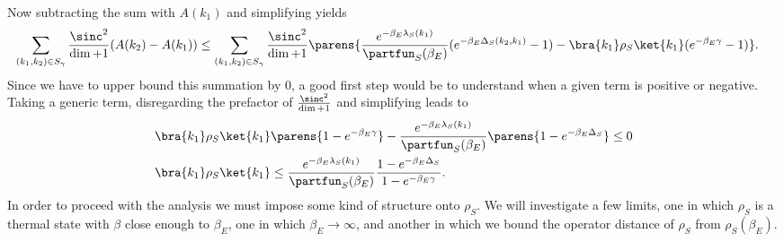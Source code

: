     Now subtracting the sum with $A(k_1)$ and simplifying yields
    \begin{align}
        \sum_{(k_1, k_2) \in S_{\gamma}} \frac{\sinc^2}{\dim + 1} (A(k_2) - A(k_1)) &\leq \sum_{(k_1, k_2) \in S_{\gamma}} \frac{\sinc^2}{\dim + 1} \parens{\frac{e^{-\beta_E \lambda_S(k_1)}}{\partfun_S(\beta_E)} (e^{-\beta_E \Delta_S(k_2, k_1)} - 1) - \bra{k_1} \rho_S \ket{k_1} (e^{-\beta_E \gamma} - 1) } .
    \end{align}
    Since we have to upper bound this summation by 0, a good first step would be to understand when a given term is positive or negative. Taking a generic term, disregarding the prefactor of $\frac{\sinc^2}{\dim + 1}$ and simplifying leads to
    \begin{align}
        \bra{k_1} \rho_S \ket{k_1}& \parens{1 - e^{-\beta_E \gamma}} -\frac{e^{-\beta_E \lambda_S(k_1)}}{\partfun_S(\beta_E)}\parens{1 - e^{-\beta_E \Delta_S}} \leq 0 \\
        \bra{k_1} \rho_S \ket{k_1}&  \leq \frac{e^{-\beta_E \lambda_S(k_1)}}{ \partfun_S(\beta_E)}\frac{1 - e^{-\beta_E \Delta_S}}{1 - e^{-\beta_E \gamma}}.
    \end{align}
    In order to proceed with the analysis we must impose some kind of structure onto $\rho_S$. We will investigate a few limits, one in which $\rho_S$ is a thermal state with $\beta$ close enough to $\beta_E$, one in which $\beta_E \to \infty$, and another in which we bound the operator distance of $\rho_S$ from $\rho_S(\beta_E)$. 
    
